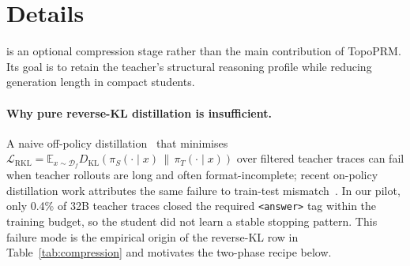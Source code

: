     
    
    \section{\framework Details}
    \label{appx:tgsd_details}
    
    \framework is an optional compression stage rather than the main contribution of
    TopoPRM. Its goal is to retain the teacher's structural reasoning profile
    while reducing generation length in compact students.
    
    \paragraph{Why pure reverse-KL distillation is insufficient.}
    A naive off-policy distillation~\citep{hinton2015distilling,minillm2023} that minimises
    $\mathcal{L}_{\mathrm{RKL}} = \mathbb{E}_{x\sim\mathcal{D}_f}
    D_{\mathrm{KL}}(\pi_S(\cdot\!\mid\!x)\,\|\,\pi_T(\cdot\!\mid\!x))$
    over filtered teacher traces can fail when teacher rollouts are long and
    often format-incomplete; recent on-policy distillation work attributes the
    same failure to train-test mismatch~\citep{agarwal2024gkd,song2026opdsurvey}.
    In our pilot, only 0.4\% of 32B teacher traces
    closed the required \texttt{<answer>} tag within the training budget, so
    the student did not learn a stable stopping pattern. This failure mode is
    the empirical origin of the reverse-KL row in Table~\ref{tab:compression}
    and motivates the two-phase \framework recipe below.
    
